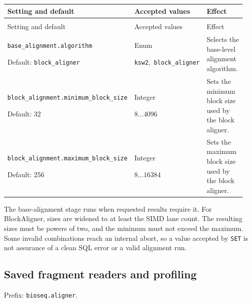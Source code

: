 \begingroup
\small
\setlength{\tabcolsep}{4pt}
\renewcommand{\arraystretch}{1.16}
\begin{longtable}{@{}>{\raggedright\arraybackslash}p{0.34\linewidth}>{\raggedright\arraybackslash}p{0.22\linewidth}>{\raggedright\arraybackslash}p{0.40\linewidth}@{}}
\toprule
Setting and default & Accepted values & Effect \\
\midrule
\endfirsthead
\multicolumn{3}{@{}l}{Prefix: \nolinkurl{bioseq.aligner} (continued)} \\
\toprule
Setting and default & Accepted values & Effect \\
\midrule
\endhead
\bottomrule
\endfoot
\nolinkurl{base_alignment.algorithm}\par Default: \nolinkurl{block_aligner} & Enum\par \nolinkurl{ksw2},\allowbreak\ \nolinkurl{block_aligner} & Selects the base-level alignment algorithm. \\[4pt]
\nolinkurl{block_alignment.minimum_block_size}\par Default: 32 & Integer\par $8\ldots 4096$ & Sets the minimum block size used by the block aligner. \\[4pt]
\nolinkurl{block_alignment.maximum_block_size}\par Default: 256 & Integer\par $8\ldots 16384$ & Sets the maximum block size used by the block aligner. \\[4pt]
\end{longtable}
\endgroup

The base-alignment stage runs when requested results require it. For
BlockAligner, sizes are widened to at least the SIMD lane count. The resulting
sizes must be powers of two, and the minimum must not exceed the maximum.
Some invalid combinations reach an internal abort, so a value accepted by
\texttt{SET} is not assurance of a clean SQL error or a valid alignment run.

\subsection{Saved fragment readers and profiling}

Prefix: \nolinkurl{bioseq.aligner}.

